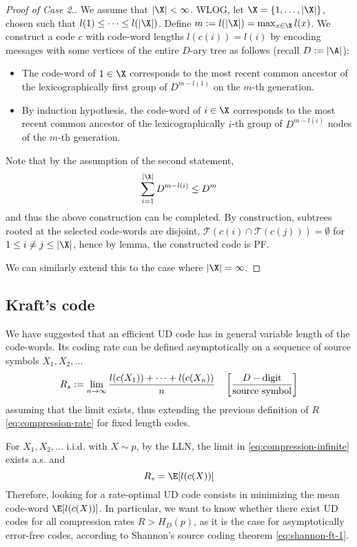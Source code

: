 \documentclass[toc]{../cs-classes/cs-classes}
\begin{document}
\begin{proof}[Proof of Case 2.]
    We assume that $|\X|<\infty$. WLOG, let $\X=\{1, \dots, |\X|\}$, chosen such that $l(1)\leq\dots\leq l(|\X|)$. Define $m:=l(|\X|)=\max_{x\in\X} l(x)$. We construct a code $c$ with code-word lengths $l(c(i))=l(i)$ by encoding messages with some vertices of the entire $D$-ary tree as follows (recall $D:=|\A|$):
    \begin{itemize}
        \item The code-word of $1\in\X$ corresponds to the most recent common ancestor of the lexicographically first group of $D^{m-l(1)}$ on the $m$-th generation.
        \item By induction hypothesis, the code-word of $i\in\X$ corresponds to the most recent common ancestor of the lexicographically $i$-th group of $D^{m-l(i)}$ nodes of the $m$-th generation.
    \end{itemize}

    Note that by the assumption of the second statement,
    \begin{equation*}
        \sum_{i=1}^{|\X|}D^{m-l(i)} \leq D^m
    \end{equation*}
    and thus the above construction can be completed. By construction, subtrees rooted at the selected code-words are disjoint, $\mathcal{T}(c(i)\cap\mathcal{T}(c(j)))=\emptyset$ for $1\leq i\neq j\leq |\X|$, hence by lemma, the constructed code is PF.
    
    We can similarly extend this to the case where $|\X|=\infty$.
\end{proof}

\subsection{Kraft's code}
We have suggested that an efficient UD code has in general variable length of the code-words. Its coding rate can be defined asymptotically on a sequence of source symbols $X_1, X_2, \dots$
\begin{equation}
    \label{eq:compression-infinite}
    R_s := \lim_{n\to\infty} \frac{l(c(X_1))+\dots+l(c(X_n))}{n} \quad \left[\frac{D-\textnormal{digit}}{\textnormal{source symbol}}\right]
\end{equation}
assuming that the limit exists, thus extending the previous definition of $R$ \eqref{eq:compression-rate} for fixed length codes.

For $X_1, X_2, \dots$ i.i.d. with $X\sim p$, by the LLN, the limit in \eqref{eq:compression-infinite} exists a.s. and
\begin{equation*}
    R_s = \E[l(c(X))]
\end{equation*}
Therefore, looking for a rate-optimal UD code consists in minimizing the mean code-word $\E[l(c(X))]$. In particular, we want to know whether there exist UD codes for all compression rates $R>H_D(p)$, as it is the case for asymptotically error-free codes, according to Shannon's source coding theorem \eqref{eq:shannon-ft-1}.
\end{document}
